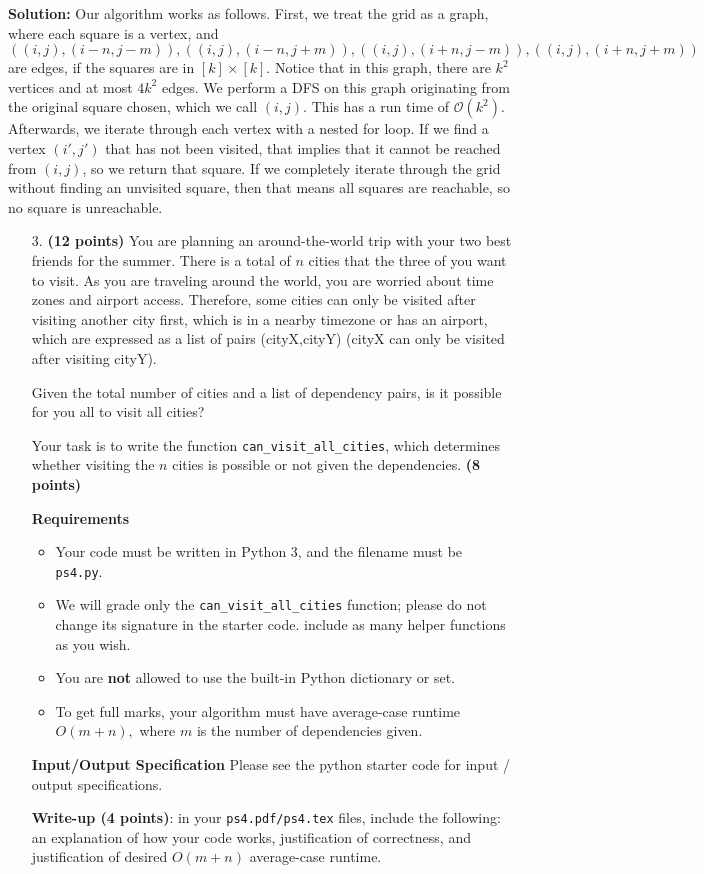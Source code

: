 \documentclass{assignment-263}
\begin{document}
 \textbf{Solution:} Our algorithm works as follows. First, we treat the grid as a graph, where each square is a vertex, and
 \[
  ((i,j), (i - n, j - m)),((i,j), (i - n, j + m)),((i,j), (i + n, j - m)),((i,j), (i + n, j + m))
 \]
 are edges, if the squares are in \([k]\times [k]\). Notice that in this graph, there are \(k^2\) vertices and at most \(4k^2\) edges. We perform a DFS on this graph originating from the original square chosen, which we call \((i,j)\). This has a run time of \(\mathcal{O} (k^2)\). Afterwards, we iterate through each vertex with a nested for loop. If we find a vertex \((i', j')\) that has not been visited, that implies that it cannot be reached from \((i,j)\), so we return that square. If we completely iterate through the grid without finding an unvisited square, then that means all squares are reachable, so no square is unreachable.

\program

\begin{enumerate}
\item[3.] \textbf{(12 points)}
  You are planning an around-the-world trip with your two best friends for the summer. 
There is a total of $n$ cities that the three of you want to visit.
As you are traveling around the world, you are worried about time zones and airport access. Therefore, some cities can only be visited after visiting another city first, which is in a nearby timezone or has an airport, which are expressed as a list of pairs (cityX,cityY) (cityX can only be visited after visiting cityY).

Given the total number of cities and a list of dependency pairs, is it possible for you all to visit all cities?

Your task is to write the function \verb|can_visit_all_cities|, which determines whether visiting the $n$ cities is possible or not given the dependencies. \textbf{(8 points)}

\textbf{Requirements}
\begin{itemize}
\item Your code must be written in Python 3, and the filename must be \verb|ps4.py|.
\item We will grade only the \verb|can_visit_all_cities| function; please do not change its signature in the starter code. include as many helper functions as you wish.
\item You are {\bf not} allowed to use the built-in Python dictionary or set.
\item To get full marks, your algorithm must have average-case runtime
  ${O}(m + n),$ where $m$ is the number of dependencies given.
\end{itemize}

\textbf{Input/Output Specification}
Please see the python starter code for input / output
specifications. 

\textbf{Write-up (4 points)}: in your \verb|ps4.pdf/ps4.tex| files,
include the following: an explanation of how your code works,
justification of correctness, and justification of desired
${O}(m + n)$ average-case runtime.

\end{enumerate}
\end{document}
